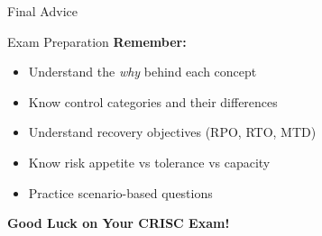 \documentclass{beamer}
\begin{document}
	\begin{frame}{Final Advice}
		\begin{block}{Exam Preparation}
			\centering
			\vspace{0.3cm}
			\textbf{Remember:}
			\begin{itemize}
				\item Understand the \textit{why} behind each concept
				\item Know control categories and their differences
				\item Understand recovery objectives (RPO, RTO, MTD)
				\item Know risk appetite vs tolerance vs capacity
				\item Practice scenario-based questions
			\end{itemize}
			\vspace{0.5cm}
			\textbf{Good Luck on Your CRISC Exam!}
		\end{block}
	\end{frame}
	
\end{document}
